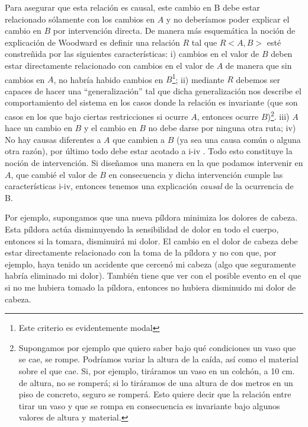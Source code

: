 Para asegurar que esta relación es causal, este cambio en B debe estar relacionado sólamente con los cambios en $A$ y no deberíamos poder explicar el cambio en $B$ por intervención directa. De manera más esquemática la noción de explicación de Woodward es definir una relación $R$ tal que $R<A, B>$ esté constreñida por las siguientes características: i) cambios en el valor de $B$ deben estar directamente relacionado con cambios en el valor de $A$ de manera que sin cambios en $A$, no habría habido cambios en $B$\footnote{Este criterio es evidentemente modal}; ii) mediante $R$ debemos ser capaces de hacer una ``generalización'' tal que dicha generalización nos describe el comportamiento del sistema en los casos donde la relación es invariante (que son casos en los que bajo ciertas restricciones si ocurre $A$, entonces ocurre $B$)\footnote{Supongamos por ejemplo que quiero saber bajo qué condiciones un vaso que se cae, se rompe. Podríamos variar la altura de la caída, así como el material sobre el que cae. Si, por ejemplo, tiráramos un vaso en un colchón, a 10 cm. de altura, no se romperá; si lo tiráramos de una altura de dos metros en un piso de concreto, seguro se romperá. Esto quiere decir que la relación entre tirar un vaso y que se rompa en consecuencia es invariante bajo algunos valores de altura y material.}.  iii) $A$ hace un cambio en $B$ y el cambio en $B$ no debe darse por ninguna otra ruta; iv) No hay causas diferentes a $A$ que cambien a $B$ (ya sea una causa común o alguna otra razón), por último todo debe estar acotado a i-iv \cite[p. 201]{Woodward2000}. Todo esto constituye la noción de intervención. Si diseñamos una manera en la que podamos intervenir en  $A$, que cambié el valor de $B$ en consecuencia y dicha intervención cumple las características i-iv, entonces tenemos una explicación \textit{causal} de la ocurrencia de B.

Por ejemplo, supongamos que una nueva píldora minimiza los dolores de cabeza. Esta píldora actúa disminuyendo la sensibilidad de dolor en todo el cuerpo, entonces si la tomara, disminuirá mi dolor. El cambio en el dolor de cabeza debe estar directamente relacionado con la toma de la píldora y no con que, por ejemplo, haya tenido un accidente que cercenó mi cabeza (algo que seguramente habría eliminado mi dolor). También tiene que ver con el posible evento en el que si no me hubiera tomado la píldora, entonces no hubiera disminuido mi dolor de cabeza.

